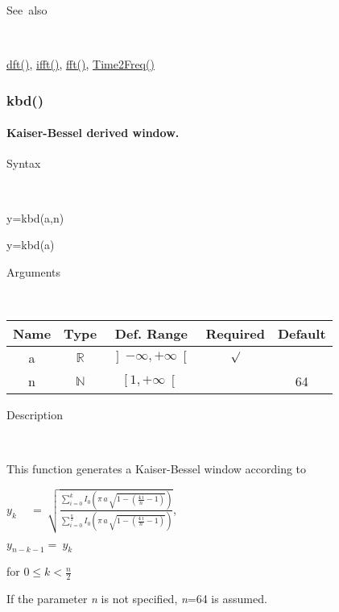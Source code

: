 \begin{description}
\item [See~also]~
\end{description}
\textcolor{blue}{\hyperlink{dft}{dft()}}\textcolor{black}{,} \textcolor{blue}{\hyperlink{ifft}{ifft()}}\textcolor{black}{,}
\textcolor{blue}{\hyperlink{fft}{fft()}}\textcolor{black}{,}
\textcolor{blue}{\hyperlink{Time2Freq}{Time2Freq()}}

\newpage
\subsubsection*{\hypertarget{kbd}{}{\Large kbd()}}


\paragraph{\label{par:Kaiser-Bessel-window}Kaiser-Bessel derived window.}

\begin{description}
\item [Syntax]~
\end{description}
y=kbd(a,n)

y=kbd(a)

\begin{description}
\item [Arguments]~
\end{description}
\begin{tabular}{|c|c|c|c|c|}
\hline 
Name&
Type&
Def. Range&
Required&
Default\tabularnewline
\hline
\hline 
a&
$\mathbb{R}$&
$\left]-\infty,+\infty\right[$&
$\surd$&
\tabularnewline
\hline 
n&
$\mathbb{N}$&
$\left[1,+\infty\right[$&
&
64\tabularnewline
\hline
\end{tabular}

\begin{description}
\item [Description]~
\end{description}
This function generates a Kaiser-Bessel window according to

\medskip{}
$y_{k}\quad\,=\:{\displaystyle \sqrt{\frac{\sum\limits _{i=0}^{k}I_{0}\left(\pi\, a\,\sqrt{1-\left(\frac{4\, i}{n}-1\right)}\right)}{\sum\limits _{i=0}^{\frac{n}{2}}I_{0}\left(\pi\, a\,\sqrt{1-\left(\frac{4\, i}{n}-1\right)}\right)}}}$,
\medskip{}

$y_{n-k-1}=\: y_{k}$
\medskip{}

for $0\leq k<\frac{n}{2}$
\medskip{}

If the parameter \textit{n} is not specified, \textit{n}=64
is assumed.

